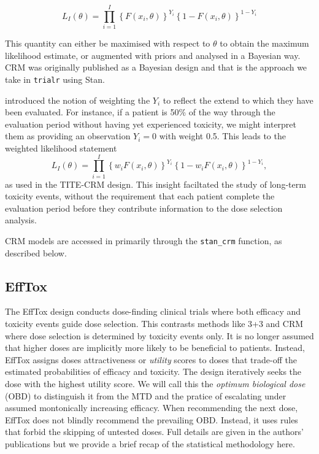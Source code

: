 \documentclass[article]{jss}
\begin{document}
\[ L_I(\theta) = \prod_{i=1}^I \left\{ F(x_i, \theta) \right\}^{Y_i} \left\{ 1 - F(x_i, \theta) \right\}^{1-Y_i} \]

This quantity can either be maximised with respect to \(\theta\) to
obtain the maximum likelihood estimate, or augmented with priors and
analysed in a Bayesian way. CRM was originally published as a Bayesian
design and that is the approach we take in \texttt{trialr} using Stan.

\citet{Cheung2000} introduced the notion of weighting the \(Y_i\) to
reflect the extend to which they have been evaluated. For instance, if a
patient is 50\% of the way through the evaluation period without having
yet experienced toxicity, we might interpret them as providing an
observation \(Y_i = 0\) with weight 0.5. This leads to the weighted
likelihood statement
\[ L_I(\theta) = \prod_{i=1}^I \left\{ w_i F(x_i, \theta) \right\}^{Y_i} \left\{ 1 - w_i F(x_i, \theta) \right\}^{1-Y_i}, \]
as used in the TITE-CRM design. This insight faciltated the study of
long-term toxicity events, without the requirement that each patient
complete the evaluation period before they contribute information to the
dose selection analysis.

CRM models are accessed in  primarily through the
\texttt{stan\_crm} function, as described below.

\hypertarget{efftox}{%
\subsection{EffTox}\label{efftox}}

The EffTox design \citep{Thall2004, Thall2006, Thall2014} conducts
dose-finding clinical trials where both efficacy and toxicity events
guide dose selection. This contrasts methods like 3+3 and CRM where dose
selection is determined by toxicity events only. It is no longer assumed
that higher doses are implicitly more likely to be beneficial to
patients. Instead, EffTox assigns doses attractiveness or
\textit{utility} scores to doses that trade-off the estimated
probabilities of efficacy and toxicity. The design iteratively seeks the
dose with the highest utility score. We will call this the
\textit{optimum biological dose} (OBD) to distinguish it from the MTD
and the pratice of escalating under assumed montonically increasing
efficacy. When recommending the next dose, EffTox does not blindly
recommend the prevailing OBD. Instead, it uses rules that forbid the
skipping of untested doses. Full details are given in the authors'
publications but we provide a brief recap of the statistical methodology
here.
\end{document}
